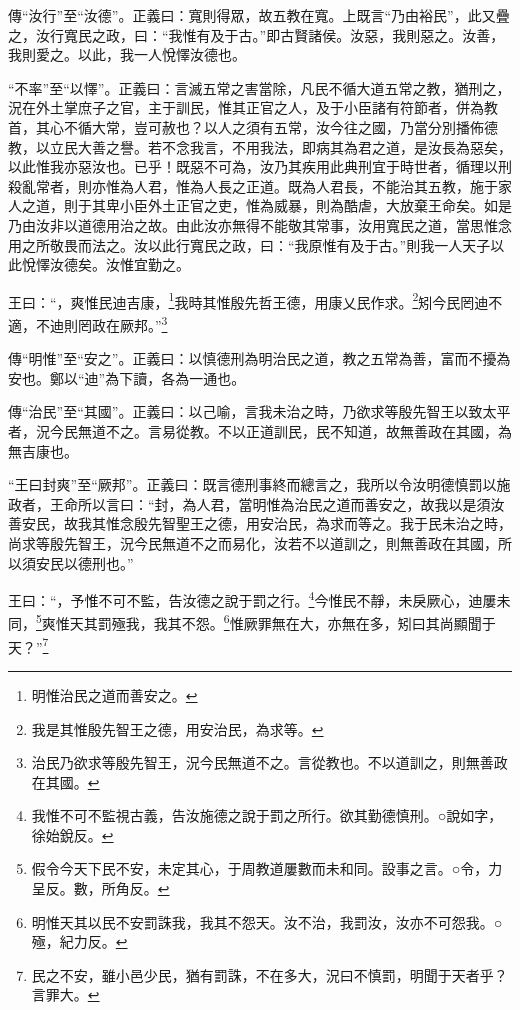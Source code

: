 {\noindent\zhuan{}\fzbyks 傳“汝行”至“汝德”。正義曰：寬則得眾，故五教在寬。上既言“乃由裕民”，此又疊之，汝行寬民之政，曰：“我惟有及于古。”即古賢諸侯。汝惡，我則惡之。汝善，我則愛之。以此，我一人悅懌汝德也。 \par}

{\noindent\shu{}\fzkt “不率”至“以懌”。正義曰：言滅五常之害當除，凡民不循大道五常之教，猶刑之，況在外土掌庶子之官，主于訓民，惟其正官之人，及于小臣諸有符節者，併為教首，其心不循大常，豈可赦也？以人之須有五常，汝今往之國，乃當分別播佈德教，以立民大善之譽。若不念我言，不用我法，即病其為君之道，是汝長為惡矣，以此惟我亦惡汝也。已乎！既惡不可為，汝乃其疾用此典刑宜于時世者，循理以刑殺亂常者，則亦惟為人君，惟為人長之正道。既為人君長，不能治其五教，施于家人之道，則于其卑小臣外土正官之吏，惟為威暴，則為酷虐，大放棄王命矣。如是乃由汝非以道德用治之故。由此汝亦無得不能敬其常事，汝用寬民之道，當思惟念用之所敬畏而法之。汝以此行寬民之政，曰：“我原惟有及于古。”則我一人天子以此悅懌汝德矣。汝惟宜勤之。 \par}

王曰：“，爽惟民迪吉康，\footnote{明惟治民之道而善安之。}我時其惟殷先哲王德，用康乂民作求。\footnote{我是其惟殷先智王之德，用安治民，為求等。}矧今民罔迪不適，不迪則罔政在厥邦。”\footnote{治民乃欲求等殷先智王，況今民無道不之。言從教也。不以道訓之，則無善政在其國。}


{\noindent\zhuan{}\fzbyks 傳“明惟”至“安之”。正義曰：以慎德刑為明治民之道，教之五常為善，富而不擾為安也。鄭以“迪”為下讀，各為一通也。 \par}

{\noindent\zhuan{}\fzbyks 傳“治民”至“其國”。正義曰：以己喻，言我未治之時，乃欲求等殷先智王以致太平者，況今民無道不之。言易從教。不以正道訓民，民不知道，故無善政在其國，為無吉康也。 \par}

{\noindent\shu{}\fzkt “王曰封爽”至“厥邦”。正義曰：既言德刑事終而總言之，我所以令汝明德慎罰以施政者，王命所以言曰：“封，為人君，當明惟為治民之道而善安之，故我以是須汝善安民，故我其惟念殷先智聖王之德，用安治民，為求而等之。我于民未治之時，尚求等殷先智王，況今民無道不之而易化，汝若不以道訓之，則無善政在其國，所以須安民以德刑也。” \par}

王曰：“，予惟不可不監，告汝德之說于罰之行。\footnote{我惟不可不監視古義，告汝施德之說于罰之所行。欲其勤德慎刑。○說如字，徐始銳反。}今惟民不靜，未戾厥心，迪屢未同，\footnote{假令今天下民不安，未定其心，于周教道屢數而未和同。設事之言。○令，力呈反。數，所角反。}爽惟天其罰殛我，我其不怨。\footnote{明惟天其以民不安罰誅我，我其不怨天。汝不治，我罰汝，汝亦不可怨我。○殛，紀力反。}惟厥罪無在大，亦無在多，矧曰其尚顯聞于天？”\footnote{民之不安，雖小邑少民，猶有罰誅，不在多大，況曰不慎罰，明聞于天者乎？言罪大。}



